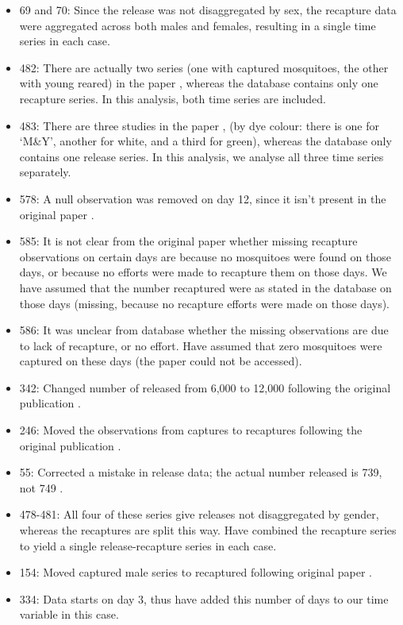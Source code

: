 \documentclass[12pt]{article}
\begin{document}
\begin{itemize}
	\item 69 and 70: Since the release was not disaggregated by sex, the recapture data were aggregated across both males and females, resulting in a single time series in each case.
	\item 482: There are actually two series (one with captured mosquitoes, the other with young reared) in the paper \cite[]{rawlings1981influence}, whereas the database contains only one recapture series. In this analysis, both time series are included.
	\item 483: There are three studies in the paper \cite[]{rawlings1981influence}, (by dye colour: there is one for `M\&Y', another for white, and a third for green), whereas the database only contains one release series. In this analysis, we analyse all three time series separately.
	\item 578: A null observation was removed on day 12, since it isn't present in the original paper \cite[]{eyles1943experiment}.
	\item 585: It is not clear from the original paper \cite[]{smith1941observations} whether missing recapture observations on certain days are because no mosquitoes were found on those days, or because no efforts were made to recapture them on those days. We have assumed that the number recaptured were as stated in the database on those days (missing, because no recapture efforts were made on those days).
	\item 586: It was unclear from database whether the missing observations are due to lack of recapture, or no effort. Have assumed that zero mosquitoes were captured on these days (the paper could not be accessed).
	\item 342: Changed number of released from 6,000 to 12,000 following the original publication \cite[]{bryan1991anopheles}.
	\item 246: Moved the observations from captures to recaptures following the original publication \cite[]{arredondo1998gonotrophic}.
	\item 55: Corrected a mistake in release data; the actual number released is 739, not 749 \cite[]{midega2007estimating}.
	\item 478-481: All four of these series give releases not disaggregated by gender, whereas the recaptures are split this way. Have combined the recapture series to yield a single release-recapture series in each case.
	\item 154: Moved captured male series to recaptured following original paper \cite[]{tsuda2001movement}. 
	\item 334: Data starts on day 3, thus have added this number of days to our time variable in this case.
\end{itemize}
\end{document}
